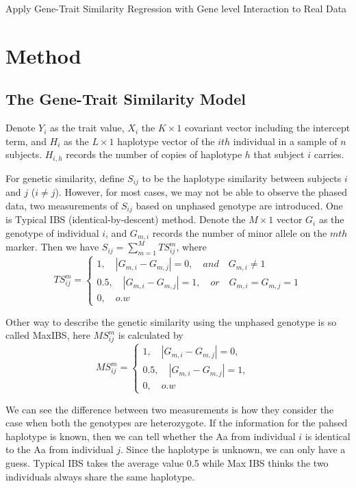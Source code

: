 \documentclass{article}
\begin{document}
    \begin{center}
        \Large{Apply Gene-Trait Similarity Regression with Gene level Interaction to Real Data}
    \end{center}

    \fontsize{11pt}{\baselineskip}\selectfont

    \section{Method}

        \subsection{The Gene-Trait Similarity Model}
         Denote $Y_i$ as the trait value, $X_i$ the $K\times 1$ covariant vector including the intercept term, and $H_i$ as the $L\times1$ haplotype vector of the $ith$ individual in a sample of $n$ subjects. $H_{i,h}$ records the number of copies of haplotype $h$ that subject $i$ carries.

         For genetic similarity, define $S_{ij}$ to be the haplotype similarity between subjects $i$ and $j$ ($i\neq j$). However, for most cases, we may not be able to observe the phased data, two measurements of $S_{ij}$ based on unphased genotype are introduced. One is Typical IBS (identical-by-descent) method. Denote the $M\times1$ vector $G_i$ as the genotype of individual $i$, and $G_{m,i}$ records the number of minor allele on the $mth$ marker. Then we have $S_{ij}=\sum^M_{m=1}TS_{ij}^m$, where
         \[ TS_{ij}^m=\begin{cases}
                1,\quad |G_{m,i}-G_{m,j}|=0,\quad and \quad G_{m,i}\neq1 \\
                0.5,\quad |G_{m,i}-G_{m,j}|=1,\quad or \quad G_{m,i}=G_{m,j}=1 \\
                0,\quad o.w
         \end{cases} \]

         Other way to describe the genetic similarity using the unphased genotype is so called MaxIBS, here $MS_{ij}^m$ is calculated by
         \[ MS_{ij}^m=\begin{cases}
                1,\quad |G_{m,i}-G_{m,j}|=0,\quad \\
                0.5,\quad |G_{m,i}-G_{m,j}|=1,\quad \\
                0,\quad o.w
         \end{cases} \]

         We can see the difference between two measurements is how they consider the case when both the genotypes are heterozygote. If the information for the pahsed haplotype is known,  then we can tell whether the Aa from individual $i$ is identical to the Aa from individual $j$. Since the haplotype is unknown, we can only have a guess. Typical IBS takes the average value 0.5 while Max IBS thinks the two individuals always share the same haplotype.
\end{document}
